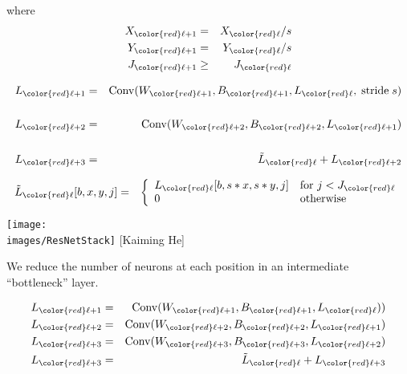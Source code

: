 {\vfill
where
\begin{eqnarray*}
X_{\color{red} \ell+1} & = & X_{\color{red} \ell}/s \\
Y_{\color{red} \ell+1} & = & Y_{\color{red} \ell}/s \\
J_{\color{red} \ell+1} & \geq &  J_{\color{red} \ell}
\end{eqnarray*}


\medskip
\begin{eqnarray*}
L_{\color{red} \ell+1} & = & \mathrm{Conv}(W_{\color{red} \ell+1},B_{\color{red} \ell+1},L_{\color{red} \ell},\;\mathrm{stride} \;s) \\
\\
L_{\color{red} \ell+2} & = & \mathrm{Conv}(W_{\color{red} \ell+2},B_{\color{red} \ell+2},L_{\color{red} \ell+1}) \\
\\
L_{\color{red} \ell+3} & = & \tilde{L}_{\color{red} \ell} + L_{\color{red} \ell+2}
\end{eqnarray*}

\vfill
\begin{eqnarray*}
\tilde{L}_{\color{red} \ell}[b,x,y,j] & = & \left\{\begin{array}{ll} L_{\color{red} \ell}[b,s*x,s*y,j] & \mbox{for $j < J_{\color{red} \ell}$} \\ 0 & \mbox{otherwise} \end{array}\right.
\end{eqnarray*}




\centerline{\texttt{[image: \\images/ResNetStack]} {\large [Kaiming He]}}


We reduce the number of neurons at each position in an intermediate ``bottleneck'' layer.

\begin{eqnarray*}
L_{\color{red} \ell+1} & = & \mathrm{Conv}(W_{\color{red} \ell+1},B_{\color{red} \ell+1},L_{\color{red} \ell})) \\
L_{\color{red} \ell+2} & = & \mathrm{Conv}(W_{\color{red} \ell+2},B_{\color{red} \ell+2},L_{\color{red} \ell+1}) \\
L_{\color{red} \ell+3} & = & \mathrm{Conv}(W_{\color{red} \ell+3},B_{\color{red} \ell+3},L_{\color{red} \ell+2}) \\
L_{\color{red} \ell+3} & = & \tilde{L}_{\color{red} \ell} + L_{\color{red} \ell+3}
\end{eqnarray*}

}

